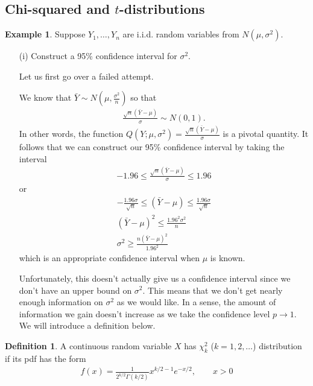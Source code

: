 \documentclass[11pt]{amsart}
\theoremstyle{definition}
\newtheorem{definition}[theorem]{Definition}
\newtheorem{example}[theorem]{Example}
\numberwithin{equation}{section}
\begin{document}
\subsection{Chi-squared and $t$-distributions}
\begin{example}
    Suppose $Y_1,\ldots,Y_n$ are i.i.d. random variables from $N(\mu,\sigma^2)$.
    \begin{enumerate}
        \item [(i)] Construct a 95\% confidence interval for $\sigma^2$.

        Let us first go over a failed attempt.

        We know that $\bar Y\sim N(\mu,\frac{\sigma^2}{n})$ so that
        \begin{align*}
            \frac{\sqrt{n}(\bar Y-\mu)}{\sigma}\sim N(0,1).
        \end{align*}
        In other words, the function $Q(Y;\mu,\sigma^2)=\frac{\sqrt{n}(\bar Y-\mu)}{\sigma}$ is a pivotal quantity. It follows that we can construct our 95\% confidence interval by taking the interval
        \begin{align*}
            -1.96\le \frac{\sqrt{n}(\bar Y-\mu)}{\sigma}\le 1.96
        \end{align*}
        or
        \begin{align*}
            -\frac{1.96\sigma}{\sqrt{n}}\le(\bar Y-\mu)\le \frac{1.96\sigma}{\sqrt{n}}\\
            (\bar Y-\mu)^2\le\frac{1.96^2\sigma^2}{n}\\
            \sigma^2\ge\frac{n(\bar Y-\mu)^2}{1.96^2}
        \end{align*}
        which is an appropriate confidence interval when $\mu$ is known.

        Unfortunately, this doesn't actually give us a confidence interval since we don't have an upper bound on $\sigma^2$. This means that we don't get nearly enough information on $\sigma^2$ as we would like. In a sense, the amount of information we gain doesn't increase as we take the confidence level $p\to 1$. We will introduce a definition below.
    \end{enumerate}
\end{example}
\begin{definition}
    A continuous random variable $X$ has $\chi^2_k$ ($k=1,2,\ldots$) distribution if its pdf has the form
    \begin{align*}
        f(x)=\frac{1}{2^{k/2}\Gamma(k/2)}x^{k/2-1}e^{-x/2},\qquad x>0
    \end{align*}
\end{definition}
\end{document}
